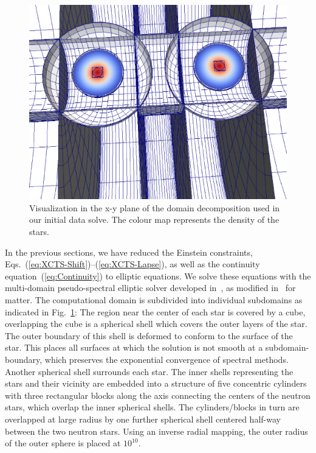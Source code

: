 \begin{figure}
\includegraphics[width=0.95\columnwidth,trim=0 185 0 0, clip=true]{chap2/TheDomain}
\caption[Visualization of the BNS initial data domain decomposition.]{\label{fig:TheDomain} Visualization in the x-y plane of the
  domain decomposition used in our initial data solve. The colour map
  represents the density of the stars. }
\end{figure}

In the previous sections, we have reduced the Einstein
  constraints, Eqs.~(\ref{eq:XCTS-Shift})--(\ref{eq:XCTS-Lapse}), as
  well as the continuity equation~(\ref{eq:Continuity}) to elliptic
  equations. We solve these equations with the multi-domain
  pseudo-spectral elliptic solver developed in~\cite{Pfeiffer2003}, as
  modified in~\cite{FoucartEtAl:2008} for matter. The
  computational domain is subdivided into individual subdomains as
  indicated in Fig.~\ref{fig:TheDomain}: The region near the center of
  each star is covered by a cube, overlapping the cube is a spherical
  shell which covers the outer layers of the star. The outer boundary
  of this shell is deformed to conform to the surface of the star.
  This places all surfaces at which the solution is not smooth at a
  subdomain-boundary, which preserves the exponential convergence of
  spectral methods. 
  Another spherical shell surrounds each star. The
  inner shells representing the stars and their vicinity are embedded
  into a structure of five concentric cylinders with three rectangular
  blocks along the axis connecting the centers of the neutron stars,
  which overlap the inner spherical shells. The cylinders/blocks in
  turn are overlapped at large radius by one further spherical shell
  centered half-way between the two neutron stars. Using an inverse radial mapping, the outer radius of the outer sphere is placed at $10^{10}$.
 
